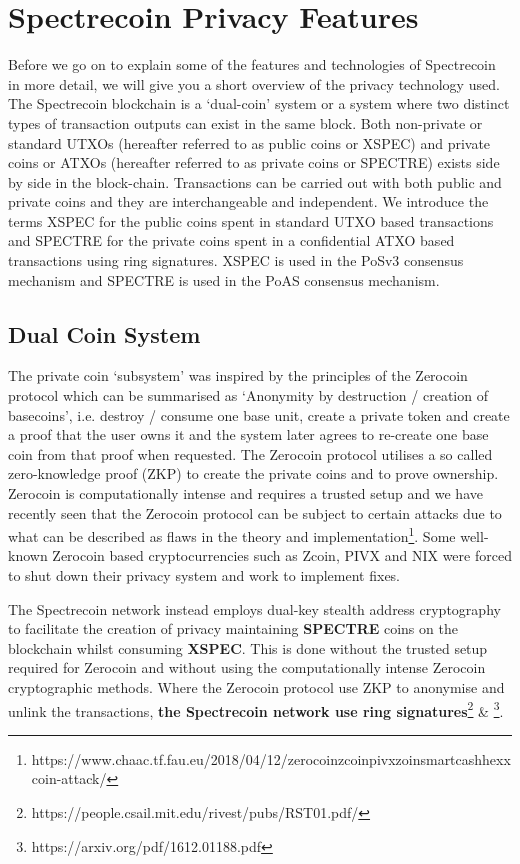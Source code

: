 \section{Spectrecoin Privacy Features}
Before we go on to explain some of the features and technologies of
Spectrecoin in more detail, we will give you a short overview of the
privacy technology used. The Spectrecoin blockchain is a ‘dual-coin’
system or a system where two distinct types of transaction outputs can
exist in the same block. Both non-private or standard UTXOs (hereafter
referred to as public coins or XSPEC) and private coins or ATXOs (hereafter
referred to as private coins or SPECTRE) exists side by side in the
block-chain. Transactions can be carried out with both public and private
coins and they are interchangeable and independent. We introduce the terms
XSPEC for the public coins spent in standard UTXO based transactions and
SPECTRE for the private coins spent in a confidential ATXO based
transactions using ring signatures. XSPEC is used in the PoSv3 consensus
mechanism and SPECTRE is used in the PoAS consensus mechanism.



\subsection{Dual Coin System}
The private coin ‘subsystem’ was inspired by the principles of the Zerocoin
protocol which can be summarised as ‘Anonymity by destruction / creation of
basecoins’, i.e. destroy / consume one base unit, create a private token
and create a proof that the user owns it and the system later agrees to
re-create one base coin from that proof when requested. The Zerocoin protocol
utilises a so called zero-knowledge proof (ZKP) to create the private coins
and to prove ownership. Zerocoin is computationally intense and requires a
trusted setup and we have recently seen that the Zerocoin protocol can be
subject to certain attacks due to what can be described as flaws in the
theory and 
implementation\footnote{https://www.chaac.tf.fau.eu/2018/04/12/zerocoinzcoinpivxzoinsmartcashhexxcoin-attack/}. 
Some well-known Zerocoin based cryptocurrencies
such as Zcoin, PIVX and NIX were forced to shut down their privacy system and
work to implement fixes.



The Spectrecoin network instead employs dual-key stealth address cryptography
to facilitate the creation of privacy maintaining \textbf{SPECTRE} coins on the
blockchain whilst consuming \textbf{XSPEC}. This is done without the trusted setup
required for Zerocoin and without using the computationally intense Zerocoin
cryptographic methods. Where the Zerocoin protocol use ZKP to anonymise and
unlink the transactions, 
\textbf{the Spectrecoin network use ring signatures}\footnote{https://people.csail.mit.edu/rivest/pubs/RST01.pdf/} 
\& \footnote{https://arxiv.org/pdf/1612.01188.pdf}.



